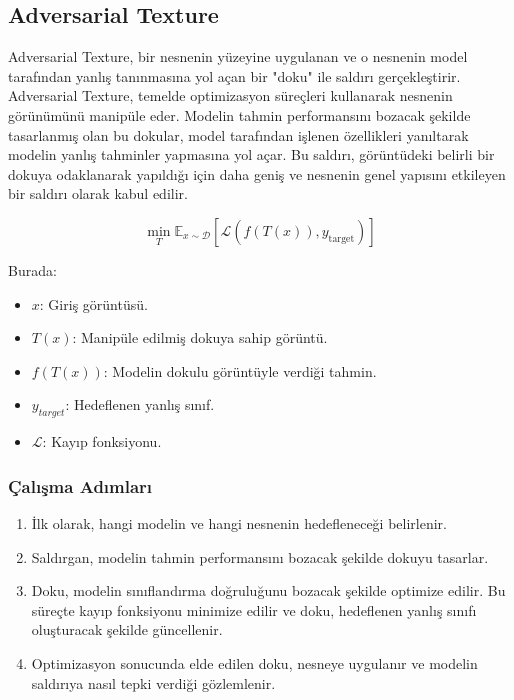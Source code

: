 \newpage

\subsection{Adversarial Texture}

Adversarial Texture, bir nesnenin yüzeyine uygulanan ve o nesnenin model tarafından yanlış tanınmasına yol açan bir "doku" ile saldırı gerçekleştirir. Adversarial Texture, temelde optimizasyon süreçleri kullanarak nesnenin görünümünü manipüle eder. Modelin tahmin performansını bozacak şekilde tasarlanmış olan bu dokular, model tarafından işlenen özellikleri yanıltarak modelin yanlış tahminler yapmasına yol açar. Bu saldırı, görüntüdeki belirli bir dokuya odaklanarak yapıldığı için daha geniş ve nesnenin genel yapısını etkileyen bir saldırı olarak kabul edilir.

\[ \min_{T} \mathbb{E}_{x \sim \mathcal{D}} \left[ \mathcal{L}(f(T(x)), y_{\text{target}}) \right] \]

Burada:

\begin{itemize}
    \item $x$: Giriş görüntüsü.
    \item $T(x)$: Manipüle edilmiş dokuya sahip görüntü.
    \item $f(T(x))$: Modelin dokulu görüntüyle verdiği tahmin.
    \item $y_{target}$: Hedeflenen yanlış sınıf.
    \item $\mathcal{L}$: Kayıp fonksiyonu.
\end{itemize}

\subsubsection{Çalışma Adımları}

\begin{enumerate}
    \item İlk olarak, hangi modelin ve hangi nesnenin hedefleneceği belirlenir.
    \item Saldırgan, modelin tahmin performansını bozacak şekilde dokuyu tasarlar.
    \item Doku, modelin sınıflandırma doğruluğunu bozacak şekilde optimize edilir. Bu süreçte kayıp fonksiyonu minimize edilir ve doku, hedeflenen yanlış sınıfı oluşturacak şekilde güncellenir.
    \item Optimizasyon sonucunda elde edilen doku, nesneye uygulanır ve modelin saldırıya nasıl tepki verdiği gözlemlenir.
\end{enumerate}

